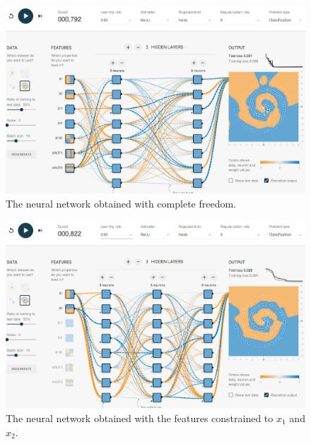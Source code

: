 \begin{figure}[htbp]
    \centering
    \includegraphics[width = 0.9\linewidth]{img/spiral_all.png}
    \caption{The neural network obtained with complete freedom.}
    \label{fig:spiral_all}
\end{figure}
\begin{figure}[htbp]
    \centering
    \includegraphics[width = 0.9\linewidth]{img/spiral_x1_x2.png}
    \caption{The neural network obtained with the features constrained to $x_1$ and $x_2$. }
    \label{fig:spiral_x1_x2}
\end{figure}

